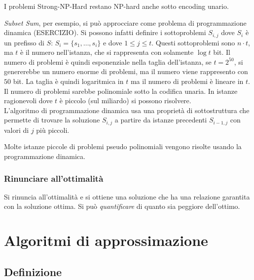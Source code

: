I problemi Strong-NP-Hard restano NP-hard anche sotto encoding unario.

\emph{Subset Sum}, per esempio, si può approcciare come problema di programmazione dinamica (ESERCIZIO).
Si
possono infatti definire 
i sottoproblemi $S_{i, j}$ dove $S_i$ è un prefisso di $S$: $ S_i = \{ s_1, \dots, s_i \} $
e dove $1 \leq j \leq t$.
Questi sottoproblemi sono
$n \cdot t$, ma $t$ è il numero nell'istanza,
che si rappresenta con solamente $\log t$ bit.
Il numero di problemi è quindi esponenziale nella taglia dell'istanza, se $t = 2^{50}$, si genererebbe un numero enorme di problemi, ma il numero viene rappresento con $50$ bit.
La taglia è quindi logaritmica in $t$ ma il numero di problemi è lineare in $t$.
Il numero di problemi sarebbe polinomiale sotto la codifica unaria.
In istanze ragionevoli dove $t$ è piccolo (sul miliardo) si possono risolvere.
\\
L'algoritmo di programmazione dinamica usa una proprietà di sottostruttura che permette di trovare la soluzione $S_{i,j}$ a partire da istanze precedenti $S_{i-1,j}$ con valori di $j$ più piccoli.

Molte istanze piccole di problemi pseudo polinomiali vengono risolte usando la programmazione dinamica.

\subsubsection{Rinunciare all'ottimalità}

Si rinuncia all'ottimalità e si ottiene una soluzione che ha una relazione garantita con la soluzione ottima. Si può \emph{quantificare} di quanto sia peggiore dell'ottimo.

\section{Algoritmi di approssimazione}

\subsection{Definizione}

